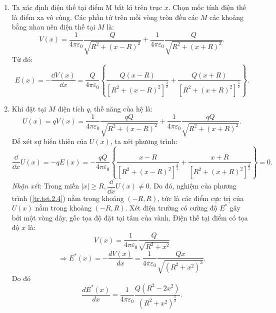\begin{vd}
\begin{center}
\end{center}
\end{vd}
\begin{loigiai}
    \begin{enumerate}[1)]
        \item Ta xác định điện thế tại điểm M bất kì trên trục $x$. Chọn mốc tính điện thế là điểm xa vô cùng. Các phần tử trên mỗi vòng tròn đều các $M$ các khoảng bằng nhau nên điện thế tại $M$ là:
        \[V(x) = \dfrac{1}{4 \pi \varepsilon_0}\dfrac{Q}{\sqrt{R^2+\left(x-R\right)^2}}+\dfrac{1}{4 \pi \varepsilon_0} \dfrac{Q}{\sqrt{R^2+\left(x+R\right)^2}}. \tag{1} \label{tr.tst.2.1}\]
        Từ đó: \[E(x)=-\dfrac{\dd V(x)}{\dd x}=\dfrac{Q}{{4\pi {\varepsilon _0}}}\left\{ {\dfrac{{Q\left( {x - R} \right)}}{{{{\left[ {{R^2} + {{\left( {x - R} \right)}^2}} \right]}^{\frac{3}{2}}}}} + \dfrac{{Q\left( {x + R} \right)}}{{{{\left[ {{R^2} + {{\left( {x + R} \right)}^2}} \right]}^{\frac{3}{2}}}}}} \right\}. \tag{2}\]
        \item Khi đặt tại $M$ điện tích $q$, thế năng của hệ là:
        \[U( x ) = qV( x ) = \dfrac{1}{{4\pi {\varepsilon _0}}}\dfrac{{qQ}}{{\sqrt {{R^2} + {{\left( {x - R} \right)}^2}} }} + \dfrac{1}{{4\pi {\varepsilon _0}}}\dfrac{{qQ}}{{\sqrt {{R^2} + {{\left( {x + R} \right)}^2}} }}. \tag{3}\]
        Để xét sự biến thiên của $U(x)$, ta xét phương trình:
        \[\dfrac{\dd}{{\dd{{x}}}}U(x) =  - qE(x) =  - \dfrac{{qQ}}{{4\pi {\varepsilon _0}}}\left\{ {\dfrac{{x - R}}{{{{\left[ {{R^2} + {{\left( {x - R} \right)}^2}} \right]}^{\frac{3}{2}}}}} + \dfrac{{x + R}}{{{{\left[ {{R^2} + {{\left( {x + R} \right)}^2}} \right]}^{\frac{3}{2}}}}}} \right\} = 0. \tag{4} \label{tr.tst.2.4}\]
        \textit{Nhận xét}: Trong miền $|x|\geqslant R, \dfrac{\dd}{\dd x}U(x) \ne 0 $. Do đó, nghiệm của phương trình (\ref{tr.tst.2.4}) nằm trong khoảng $(-R,R)$, tức là các điểm cực trị của $U(x)$ nằm trong khoảng $(-R,R)$.
        Xét điện trường có cường độ $E^*$ gây bởi một vòng dây, gốc tọa độ đặt tại tâm của vành.
        Điện thế tại điểm có tọa độ $x$ là:
        \[V(x) = \dfrac{1}{{4\pi {\varepsilon _0}}}\dfrac{Q}{{\sqrt {{R^2} + {x^2}} }}\]
        \[ \Rightarrow {E^{*}}(x) =  - \dfrac{{dV(x)}}{{dx}} = \dfrac{1}{{4\pi {\varepsilon _0}}}\dfrac{{Qx}}{{\sqrt {{{\left( {{R^2} + {x^2}} \right)}^3}} }}.\]
        Do đó
        \[\dfrac{{dE^{*}(x)}}{{dx}} = \dfrac{1}{{4\pi {\varepsilon _0}}}\dfrac{{Q\left( {{R^2} - 2{x^2}} \right)}}{{{{\left( {{R^2} + {x^2}} \right)}^{\frac{5}{2}}}}}.\]
        \begin{center}
            


\end{center}
\end{enumerate}
\end{loigiai}
